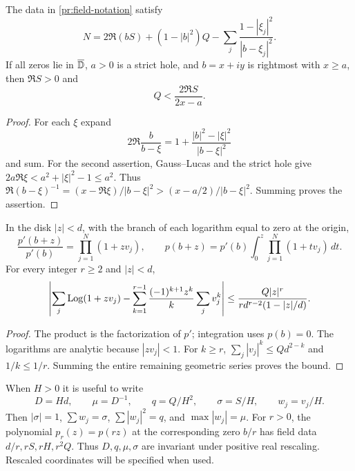 \begin{lemma}\label{pr:radial}
The data in \eqref{pr:field-notation} satisfy
\begin{equation}\label{pr:radial-identity}
 N=2\Re(bS)+(1-|b|^2)Q
       -\sum_j\frac{1-|\xi_j|^2}{|b-\xi_j|^2}.
\end{equation}
If all zeros lie in $\overline{\mathbb D}$, $a>0$ is a strict hole, and
$b=x+iy$ is rightmost with $x\ge a$,
then $\Re S>0$ and
\begin{equation}\label{pr:hole-reciprocal}
 Q<\frac{2\Re S}{2x-a}.
\end{equation}
\end{lemma}
\begin{proof}
For each $\xi$ expand
\[
 2\Re\frac b{b-\xi}
 =1+\frac{|b|^2-|\xi|^2}{|b-\xi|^2}
\]
and sum. For the second assertion, Gauss--Lucas and the strict hole give
$2a\Re\xi<a^2+|\xi|^2-1\le a^2$. Thus
$\Re(b-\xi)^{-1}=(x-\Re\xi)/|b-\xi|^2
 >(x-a/2)/|b-\xi|^2$. Summing proves the assertion.
\end{proof}

\begin{lemma}\label{pr:primitive}
In the disk $|z|<d$, with the branch of each logarithm equal to zero
at the origin,
\[
 \frac{p'(b+z)}{p'(b)}=\prod_{j=1}^N(1+zv_j),\qquad
 p(b+z)=p'(b)\int_0^z\prod_{j=1}^N(1+tv_j)\,dt.
\]
For every integer $r\ge2$ and $|z|<d$,
\begin{equation}\label{pr:complete-log-tail}
 \left|\sum_j\operatorname{Log}(1+zv_j)
 -\sum_{k=1}^{r-1}\frac{(-1)^{k+1}z^k}{k}\sum_jv_j^k\right|
 \le\frac{Q|z|^r}{r d^{r-2}(1-|z|/d)}.
\end{equation}
\end{lemma}
\begin{proof}
The product is the factorization of $p'$; integration uses $p(b)=0$.
The logarithms are analytic because $|zv_j|<1$. For $k\ge r$,
$\sum_j|v_j|^k\le Qd^{2-k}$ and $1/k\le1/r$.
Summing the entire remaining geometric series proves the bound.
\end{proof}

When $H>0$ it is useful to write
\begin{equation}\label{pr:normalized-moments}
 D=Hd,\qquad \mu=D^{-1},\qquad q=Q/H^2,\qquad
 \sigma=S/H,\qquad w_j=v_j/H.
\end{equation}
Then $|\sigma|=1$, $\sum w_j=\sigma$,
$\sum|w_j|^2=q$, and $\max|w_j|=\mu$. For $r>0$, the
polynomial $p_r(z)=p(rz)$ at the corresponding zero $b/r$ has
field data $d/r,rS,rH,r^2Q$. Thus $D,q,\mu,\sigma$ are invariant
under positive real rescaling. Rescaled coordinates will be specified
when used.
